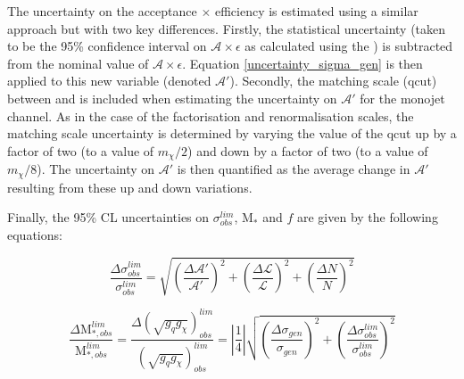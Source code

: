 \begin{flushleft}
\bigskip

The uncertainty on the acceptance $\times$ efficiency is estimated using a similar approach but with two key differences. Firstly, the statistical uncertainty (taken to be the 95\% confidence interval on $\mathcal{A}\times\epsilon$ as calculated using the ) is subtracted from the nominal value of $\mathcal{A}\times\epsilon$. Equation \ref{uncertainty_sigma_gen} is then applied to this new variable (denoted $\mathcal{A}'$). Secondly, the matching scale (qcut) between \MG and \PYTHIA is included when estimating the uncertainty on $\mathcal{A}'$ for the monojet channel. As in the case of the factorisation and renormalisation scales, the matching scale uncertainty is determined by varying the value of the qcut up by a factor of two (to a value of $m_{\chi}/2$) and down by a factor of two (to a value of $m_{\chi}/8$). The uncertainty on $\mathcal{A}'$ is then quantified as the average change in $\mathcal{A}'$ resulting from these up and down variations. 
\bigskip

Finally, the 95\% CL uncertainties on $\sigma_{obs}^{lim}$, M$_{*}$ and $f$ are given by the following equations:

\begin{equation}
\label{uncertainty_sigma_lim}
\frac{\Delta \sigma_{obs}^{lim}}{\sigma_{obs}^{lim}} = \sqrt{\left(\frac{\Delta \mathcal{A}'}{\mathcal{A}'}\right)^{2} + \left(\frac{\Delta \mathcal{L}}{\mathcal{L}}\right)^{2} + \left(\frac{\Delta N}{N}\right)^{2}}
\end{equation}

\begin{equation}
\label{uncertainty_M_star}
\frac{\Delta \mbox{M}_{*,obs}^{lim}}{\mbox{M}_{*,obs}^{lim}} = \frac{\Delta (\sqrt{g_{q}g_{\chi}})_{obs}^{lim}}{(\sqrt{g_{q}g_{\chi}})_{obs}^{lim}} = \left|\frac{1}{4}\right|\sqrt{\left(\frac{\Delta \sigma_{gen}}{\sigma_{gen}}\right)^{2} + \left(\frac{\Delta \sigma_{obs}^{lim}}{\sigma_{obs}^{lim}}\right)^{2}}
\end{equation}

\end{flushleft}